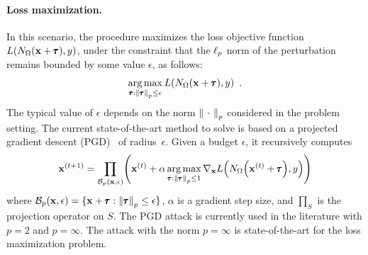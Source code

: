 \paragraph{Loss maximization.}
In this scenario, the procedure maximizes the loss objective function $L(N_\Omega(\mathbf{x} + \pmb{\tau}), y)$, under the constraint that the $\ell_p $ norm of the perturbation remains bounded by some value $\epsilon$, as follows:
\begin{equation}
  \operatorname*{arg\,max}_{\pmb{\tau}:\norm{\pmb{\tau}}_p \leq \epsilon} L(N_\Omega(\mathbf{x} + \pmb{\tau}), y) \enspace.
  \label{equation:ch2-lossmax}
\end{equation}
The typical value of $\epsilon$ depends on the norm $\norm{\ \cdot\ }_p$ considered in the problem setting.
The current state-of-the-art method to solve  is based on a projected gradient descent (PGD)~\cite{madry2018towards} of radius~$\epsilon$.
Given a budget $\epsilon$, it recursively computes
\begin{equation}
  \xvec^{(t+1)} = \prod_{\mathcal{B}_p(\xvec,\epsilon)}\left(\xvec^{(t)}
    + \alpha \argmax_{\adv: \norm{\adv}_p \leq 1} \nabla_\xvec L\left( \nn_\weights \left(\xvec^{(t)} + \adv \right), y \right)
\right)
  \label{equation:ch2-projectionPGD}
\end{equation}
where $\mathcal{B}_p(\mathbf{x},\epsilon) = \{ \mathbf{x} + \pmb{\tau}:\norm{\pmb{\tau}}_p \leq \epsilon\}$, $\alpha$ is a gradient step size, and $\prod_S$ is the projection operator on $S$.
The PGD attack is currently used in the literature with $p=2$ and $p=\infty$.
The attack with the norm $p=\infty$ is state-of-the-art for the loss maximization problem. 

